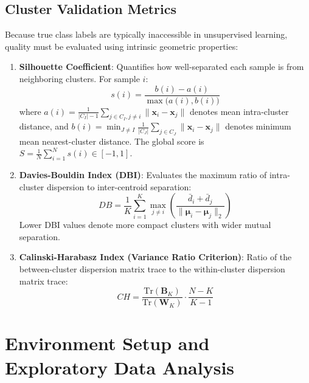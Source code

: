 \documentclass[12pt]{article}
\begin{document}
\subsection{Cluster Validation Metrics}
Because true class labels are typically inaccessible in unsupervised learning, quality must be evaluated using intrinsic geometric properties:
\begin{enumerate}
    \item \textbf{Silhouette Coefficient}: Quantifies how well-separated each sample is from neighboring clusters. For sample $i$:
    \begin{equation}
    s(i) = \frac{b(i) - a(i)}{\max\big(a(i), b(i)\big)}
    \end{equation}
    where $a(i) = \frac{1}{|C_I| - 1} \sum_{j \in C_I, j \neq i} \|\mathbf{x}_i - \mathbf{x}_j\|$ denotes mean intra-cluster distance, and $b(i) = \min_{J \neq I} \frac{1}{|C_J|} \sum_{j \in C_J} \|\mathbf{x}_i - \mathbf{x}_j\|$ denotes minimum mean nearest-cluster distance. The global score is $S = \frac{1}{N}\sum_{i=1}^N s(i) \in [-1, 1]$.
    \item \textbf{Davies-Bouldin Index (DBI)}: Evaluates the maximum ratio of intra-cluster dispersion to inter-centroid separation:
    \begin{equation}
    DB = \frac{1}{K} \sum_{i=1}^K \max_{j \neq i} \left( \frac{\bar{d}_i + \bar{d}_j}{\|\boldsymbol{\mu}_i - \boldsymbol{\mu}_j\|_2} \right)
    \end{equation}
    Lower DBI values denote more compact clusters with wider mutual separation.
    \item \textbf{Calinski-Harabasz Index (Variance Ratio Criterion)}: Ratio of the between-cluster dispersion matrix trace to the within-cluster dispersion matrix trace:
    \begin{equation}
    CH = \frac{\text{Tr}(\mathbf{B}_K)}{\text{Tr}(\mathbf{W}_K)} \cdot \frac{N - K}{K - 1}
    \end{equation}
\end{enumerate}

\section{Environment Setup and Exploratory Data Analysis}
\end{document}
